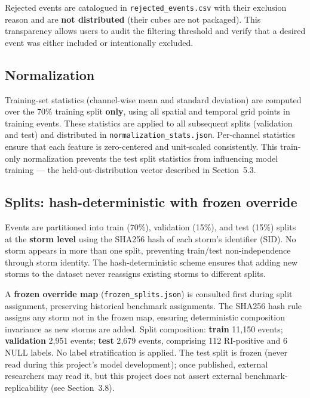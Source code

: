 \documentclass[11pt]{article}
\begin{document}
Rejected events are catalogued in \texttt{rejected\_events.csv} with their
exclusion reason and are \textbf{not distributed} (their cubes are not
packaged). This transparency allows users to audit the filtering threshold and
verify that a desired event was either included or intentionally excluded.

\subsection{Normalization}

Training-set statistics (channel-wise mean and standard deviation) are
computed over the 70\% training split \textbf{only}, using all spatial and
temporal grid points in training events. These statistics are applied to all
subsequent splits (validation and test) and distributed in
\texttt{normalization\_stats.json}. Per-channel statistics ensure that each
feature is zero-centered and unit-scaled consistently. This train-only
normalization prevents the test split statistics from influencing model
training --- the held-out-distribution vector described in Section~5.3.

\subsection{Splits: hash-deterministic with frozen override}

Events are partitioned into train (70\%), validation (15\%), and test (15\%)
splits at the \textbf{storm level} using the SHA256 hash of each storm's
identifier (SID). No storm appears in more than one split, preventing
train/test non-independence through storm identity. The hash-deterministic
scheme ensures that adding new storms to the dataset never reassigns existing
storms to different splits.

A \textbf{frozen override map} (\texttt{frozen\_splits.json}) is consulted
first during split assignment, preserving historical benchmark assignments. The
SHA256 hash rule assigns any storm not in the frozen map, ensuring
deterministic composition invariance as new storms are added. Split
composition: \textbf{train} 11{,}150 events; \textbf{validation} 2{,}951
events; \textbf{test} 2{,}679 events, comprising 112 RI-positive and 6 NULL
labels. No label stratification is applied. The test split is frozen (never
read during this project's model development); once published, external
researchers may read it, but this project does not assert external
benchmark-replicability (see Section~3.8).
\end{document}
